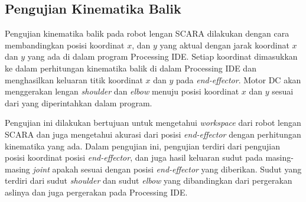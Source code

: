 

\subsection{Pengujian Kinematika Balik}
Pengujian kinematika balik pada robot lengan SCARA dilakukan dengan cara membandingkan posisi koordinat $x$, dan $y$ yang aktual dengan jarak koordinat $x$ dan $y$ yang ada di dalam program Processing IDE. Setiap koordinat dimasukkan ke dalam perhitungan kinematika balik di dalam Processing IDE dan menghasilkan keluaran titik koordinat $x$ dan $y$ pada \textit{end-effector}. Motor DC akan menggerakan lengan \textit{shoulder} dan \textit{elbow} menuju posisi koordinat $x$ dan $y$ sesuai dari yang diperintahkan dalam program.

 Pengujian ini dilakukan bertujuan untuk mengetahui \textit{workspace} dari robot lengan SCARA dan juga mengetahui akurasi dari posisi \textit{end-effector} dengan perhitungan kinematika yang ada. Dalam pengujian ini, pengujian terdiri dari pengujian posisi koordinat posisi \textit{end-effector}, dan juga hasil keluaran sudut pada masing-masing \textit{joint} apakah sesuai dengan posisi \textit{end-effector} yang diberikan. Sudut yang terdiri dari sudut \textit{shoulder} dan sudut \textit{elbow} yang dibandingkan dari pergerakan aslinya dan juga pergerakan pada Processing IDE.  

